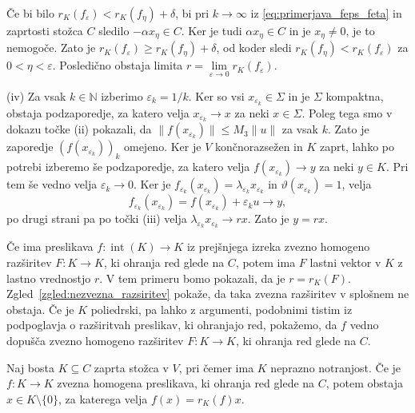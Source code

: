\documentclass[mat2, tisk]{fmfdelo}
\newcommand{\N}{\mathbb{N}}
\begin{document}
\begin{dokaz}
  Če bi bilo
  $r_K(f_\varepsilon)<r_K(f_\eta)+\delta$, bi pri
  $k\to\infty$ iz \eqref{eq:primerjava_feps_feta} in zaprtosti stožca
  $C$ sledilo $-\alpha x_\eta\in C$. Ker je tudi
  $\alpha x_\eta\in C$ in je $x_\eta\neq0$, je to nemogoče.
  Zato je
  $r_K(f_\varepsilon)\geq r_K(f_\eta)+\delta$, od koder sledi
  $r_K(f_\eta)<r_K(f_\varepsilon)$ za $0<\eta<\varepsilon$.
  Posledično obstaja limita
  $r=\lim\limits_{\varepsilon\to0}r_K(f_\varepsilon)$.

  (iv) Za vsak $k\in\N$ izberimo $\varepsilon_k=1/k$.
  Ker so vsi $x_{\varepsilon_k}\in\Sigma$ in je $\Sigma$
  kompaktna, obstaja podzaporedje, za katero velja
  $x_{\varepsilon_k}\to x$ za neki $x\in\Sigma$.
  Poleg tega smo v dokazu točke (ii) pokazali, da
  $\|f(x_{\varepsilon_k})\|\leq M_3\|u\|$ za vsak $k$.
  Zato je zaporedje $(f(x_{\varepsilon_k}))_k$ omejeno.
  Ker je $V$ končnorazsežen in $K$ zaprt, lahko po potrebi
  izberemo še podzaporedje, za katero velja
  $f(x_{\varepsilon_k})\to y$ za neki $y\in K$.
  Pri tem še vedno velja $\varepsilon_k\to0$.
  Ker je $f_{\varepsilon_k}(x_{\varepsilon_k})
  =\lambda_{\varepsilon_k}x_{\varepsilon_k}$
  in $\vartheta(x_{\varepsilon_k})=1$, velja
  \[
  f_{\varepsilon_k}(x_{\varepsilon_k})
  =f(x_{\varepsilon_k})+\varepsilon_k u
  \longrightarrow y,
  \]
  po drugi strani pa po točki (iii) velja
  $\lambda_{\varepsilon_k}x_{\varepsilon_k}\longrightarrow rx$.
  Zato je $y=rx$.
\end{dokaz}

Če ima preslikava
$f\colon\operatorname{int}(K)\longrightarrow K$ iz prejšnjega izreka
zvezno homogeno razširitev
$F\colon K\longrightarrow K$, ki ohranja red glede na $C$, potem ima
$F$ lastni vektor v $K$ z lastno vrednostjo $r$. V tem primeru bomo
pokazali, da je $r=r_K(F)$. Zgled~\ref{zgled:nezvezna_razsiritev}
pokaže, da taka zvezna razširitev v splošnem ne obstaja. Če je $K$
poliedrski, pa lahko z argumenti, podobnimi tistim iz
podpoglavja o razširitvah preslikav, ki ohranjajo red, pokažemo, da
$f$ vedno dopušča zvezno homogeno razširitev
$F\colon K\longrightarrow K$, ki ohranja red glede na $C$.

\begin{posledica}\label{posledica:spektralni_radij_lastna_vrednost}
  Naj bosta $K\subseteq C$ zaprta stožca v $V$, pri čemer ima $K$
  neprazno notranjost. Če je
  $f\colon K\longrightarrow K$ zvezna homogena preslikava, ki ohranja
  red glede na $C$, potem obstaja $x\in K\setminus\{0\}$, za katerega
  velja
  $f(x)=r_K(f)x$.
\end{posledica}
\end{document}
